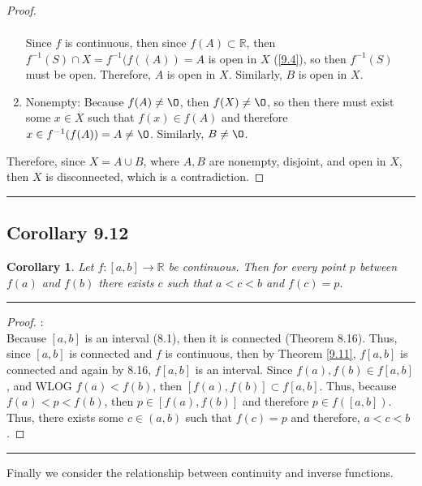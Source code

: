 \documentclass[openany, amssymb, psamsfonts]{amsart}
\newcommand{\bbR}{\mathbb{R}}
\renewcommand{\emptyset}{\O}
\newcommand{\arr}{\longrightarrow}
\newtheorem{cor}{Corollary}[section]
\theoremstyle{definition}
\numberwithin{equation}{section}
\begin{document}
\begin{proof}
\begin{enumerate}
\begin{align*}
    \end{align*}
    Since $f$ is continuous, then since $f(A) \subset \bbR$, then $f^{-1}(S) \cap X = f^{-1}(f((A)) = A$ is open in $X$ (\ref{9.4}), so then $f^{-1}(S)$ must be open. Therefore, $A$ is open in $X$. Similarly, $B$ is open in $X$. 
    \item Nonempty: Because $f(A) \neq \emptyset$, then $f(X)\neq \emptyset$, so then there must exist some $x\in X$ such that $f(x) \in f(A)$ and therefore $x\in f^{-1}(f(A))=A\neq\emptyset$. Similarly, $B\neq \emptyset$.
\end{enumerate}
Therefore, since $X = A\cup B$, where $A,B$ are nonempty, disjoint, and open in $X$, then $X$ is disconnected, which is a contradiction. 
\end{proof}\vspace{4pt}     \hrule   \vspace{4pt}


\subsection*{Corollary 9.12}
\begin{cor}  
\label{9.12}
Let $f\colon [a,b] \arr \bbR $ be continuous. Then for every point $p$ between $f(a)$ and $f(b)$ there exists $c$ such that $a<c<b$ and $f(c)=p$. 
\end{cor}
\vspace{4pt}     \hrule   \vspace{4pt}
\begin{proof}:\\
Because $[a,b]$ is an interval (8.1), then it is connected (Theorem 8.16). Thus, since $[a,b]$ is connected and $f$ is continuous, then by Theorem \ref{9.11}, $f[a,b]$ is connected and again by 8.16, $f[a,b]$ is an interval. Since $f(a), f(b) \in f[a,b]$, and WLOG $f(a)<f(b)$, then $[f(a), f(b)] \subset f[a,b]$. Thus, because $f(a)<p<f(b)$, then $p\in [f(a), f(b)]$ and therefore $p\in f([a,b])$.
Thus, there exists some $c\in (a,b)$ such that $f(c) = p$ and therefore, $a<c<b$.
\end{proof}\vspace{4pt}     \hrule   \vspace{4pt}

Finally we consider the relationship between continuity and inverse functions.
\end{document}
